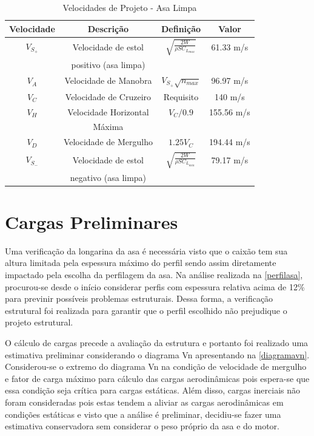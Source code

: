 \begin{table}[H]
\centering
\begin{tabular}{cccc}
\toprule
Velocidade & Descrição & Definição & Valor \\ \midrule
$V_{S_{+}}$ & Velocidade de estol & $ \sqrt{\frac{2 W}{\rho S C_{L_{max}}}} $ & 61.33 m/s \\ [0.3cm]
 & positivo (asa limpa) & &  \\ [0.3cm]
$V_A$ & Velocidade de Manobra & $ V_{S_{+}} \sqrt{n_{max}} $ & 96.97 m/s \\ [0.3cm]
$V_C$ & Velocidade de Cruzeiro & Requisito & 140 m/s \\  [0.3cm]
$V_H$ & Velocidade Horizontal & $V_C/0.9$ & 155.56 m/s \\  [0.3cm]
 & Máxima & &  \\ [0.3cm]
$V_D$ & Velocidade de Mergulho & $1.25 V_C$ & 194.44 m/s \\ [0.3cm]
$V_{S_{-}}$ & Velocidade de estol & $ \sqrt{\frac{2 W}{\rho S C_{L_{min}}}} $ & 79.17 m/s \\ [0.3cm]
 & negativo (asa limpa) & &  \\ [0.3cm]
\bottomrule
\end{tabular}
\caption[Velocidades de Projeto - Asa Limpa]{Velocidades de Projeto - Asa Limpa}
\label{tbl:velocidadesprojeto}
\end{table}

\clearpage

\section{Cargas Preliminares}

Uma verificação da longarina da asa é necessária visto que o caixão tem sua altura limitada pela espessura máximo do perfil sendo assim diretamente impactado pela escolha da perfilagem da asa. Na análise realizada na \autoref{perfilasa}, procurou-se desde o início considerar perfis com espessura relativa acima de 12\% para previnir possíveis problemas estruturais. Dessa forma, a verificação estrutural foi realizada para garantir que o perfil escolhido não prejudique o projeto estrutural.

O cálculo de cargas precede a avaliação da estrutura e portanto foi realizado uma estimativa preliminar considerando o diagrama Vn apresentando na \autoref{diagramavn}. Considerou-se o extremo do diagrama Vn na condição de velocidade de mergulho e fator de carga máximo para cálculo das cargas aerodinâmicas pois espera-se que essa condição seja crítica para cargas estáticas. Além disso, cargas inerciais não foram consideradas pois estas tendem a aliviar as cargas aerodinâmicas em condições estáticas e visto que a análise é preliminar, decidiu-se fazer uma estimativa conservadora sem considerar o peso próprio da asa e do motor.

